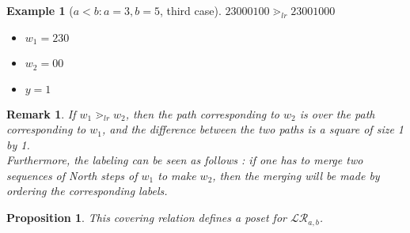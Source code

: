 \documentclass[12pt]{report}
\newtheorem*{prop}{Proposition}
\newtheorem*{example}{Example}
\newtheorem*{rem}{Remark}
\begin{document}
\begin{example}[$a < b : a = 3, b = 5$, third case]
    $23000100 \gtrdot_{lr} 23001000$
    \begin{itemize}
        \item $w_1 = 230$
        \item $w_2 = 00$
        \item $y = 1$
    \end{itemize}
\end{example}

\begin{rem}
    If $w_1 \gtrdot_{lr} w_2$, then the path corresponding to
    $w_2$ is \emph{over} the path corresponding to $w_1$,
    and the \emph{difference} between the two paths is a
    square of size 1 by 1.\\
    Furthermore, the labeling can be seen as follows :
    if one has to merge two sequences of North steps of $w_1$
    to make $w_2$, then the merging will be made by ordering the
    corresponding labels.
\end{rem}

\begin{prop}
    This covering relation defines a \emph{poset}
    for $\mathcal{LR}_{a,b}$.
\end{prop}
\end{document}
